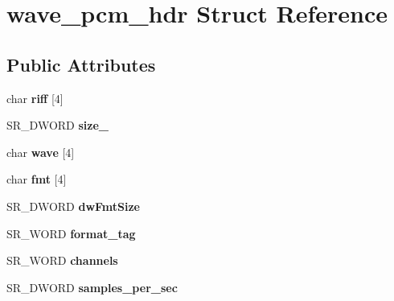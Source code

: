 \hypertarget{structwave__pcm__hdr}{\section{wave\-\_\-pcm\-\_\-hdr \-Struct \-Reference}
\label{structwave__pcm__hdr}
}
\subsection*{\-Public \-Attributes}
\begin{DoxyCompactItemize}
\item 
\hypertarget{structwave__pcm__hdr_a465105ede0769960122f5a6526c27d0f}{char {\bfseries riff} \mbox{[}4\mbox{]}}\label{structwave__pcm__hdr_a465105ede0769960122f5a6526c27d0f}

\item 
\hypertarget{structwave__pcm__hdr_a7f393e8260db8c6a5fdb0e559bed3972}{\-S\-R\-\_\-\-D\-W\-O\-R\-D {\bfseries size\-\_}}\label{structwave__pcm__hdr_a7f393e8260db8c6a5fdb0e559bed3972}

\item 
\hypertarget{structwave__pcm__hdr_ac3b996d498fc4291ba7311982db390f8}{char {\bfseries wave} \mbox{[}4\mbox{]}}\label{structwave__pcm__hdr_ac3b996d498fc4291ba7311982db390f8}

\item 
\hypertarget{structwave__pcm__hdr_a67014673b1b3655763af3c022c8656e3}{char {\bfseries fmt} \mbox{[}4\mbox{]}}\label{structwave__pcm__hdr_a67014673b1b3655763af3c022c8656e3}

\item 
\hypertarget{structwave__pcm__hdr_a605647a0cf8c12333e76934abe6b6b5a}{\-S\-R\-\_\-\-D\-W\-O\-R\-D {\bfseries dw\-Fmt\-Size}}\label{structwave__pcm__hdr_a605647a0cf8c12333e76934abe6b6b5a}

\item 
\hypertarget{structwave__pcm__hdr_adef7209ba6113e2447901e37791a3465}{\-S\-R\-\_\-\-W\-O\-R\-D {\bfseries format\-\_\-tag}}\label{structwave__pcm__hdr_adef7209ba6113e2447901e37791a3465}

\item 
\hypertarget{structwave__pcm__hdr_a9552e465986fe2a982a4c7d9f8269454}{\-S\-R\-\_\-\-W\-O\-R\-D {\bfseries channels}}\label{structwave__pcm__hdr_a9552e465986fe2a982a4c7d9f8269454}

\item 
\hypertarget{structwave__pcm__hdr_a3308eb1fef2ad476147f08b0190cce2e}{\-S\-R\-\_\-\-D\-W\-O\-R\-D {\bfseries samples\-\_\-per\-\_\-sec}}\label{structwave__pcm__hdr_a3308eb1fef2ad476147f08b0190cce2e}


\end{DoxyCompactItemize}
